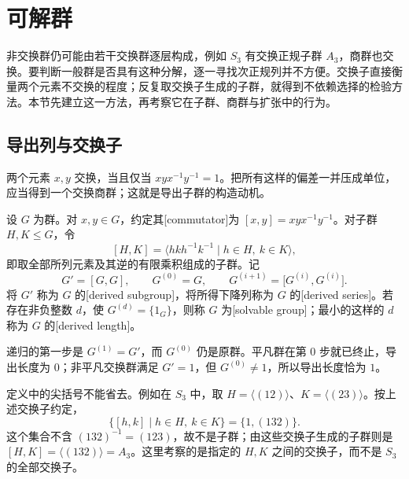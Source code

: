 
\section{可解群}
\label{b1:sec:0702}

非交换群仍可能由若干交换群逐层构成，例如 \(S_3\) 有交换正规子群 \(A_3\)，商群也交换。要判断一般群是否具有这种分解，逐一寻找次正规列并不方便。交换子直接衡量两个元素不交换的程度；反复取交换子生成的子群，就得到不依赖选择的检验方法。本节先建立这一方法，再考察它在子群、商群与扩张中的行为。

%
%

\subsection{导出列与交换子}
\label{b1:subsec:0702:01}

两个元素 \(x,y\) 交换，当且仅当 \(xyx^{-1}y^{-1}=1\)。把所有这样的偏差一并压成单位，应当得到一个交换商群；这就是导出子群的构造动机。

\begin{definition}\label{b1:def:derived-series}
	设 \(G\) 为群。对 \(x,y\in G\)，约定其[commutator]为 \([x,y]=xyx^{-1}y^{-1}\)。对子群 \(H,K\le G\)，令
	\[
		[H,K]=\bigl\langle hkh^{-1}k^{-1}\mid h\in H,\ k\in K\bigr\rangle,
	\]
	即取全部所列元素及其逆的有限乘积组成的子群。记
	\[
		G'= [G,G],\qquad G^{(0)}=G,\qquad G^{(i+1)}=\bigl[G^{(i)},G^{(i)}\bigr].
	\]
	将 \(G'\) 称为 \(G\) 的[derived subgroup]，将所得下降列称为 \(G\) 的[derived series]。若存在非负整数 \(d\)，使 \(G^{(d)}=\{1_G\}\)，则称 \(G\) 为[solvable group]；最小的这样的 \(d\) 称为 \(G\) 的[derived length]。
\end{definition}

递归的第一步是 \(G^{(1)}=G'\)，而 \(G^{(0)}\) 仍是原群。平凡群在第 \(0\) 步就已终止，导出长度为 \(0\)；非平凡交换群满足 \(G'=1\)，但 \(G^{(0)}\ne1\)，所以导出长度恰为 \(1\)。

\ProseParagraphBreak
定义中的尖括号不能省去。例如在 \(S_3\) 中，取 \(H=\langle(12)\rangle\)、\(K=\langle(23)\rangle\)。按上述交换子约定，
\[
	\bigl\{[h,k]\mid h\in H,\ k\in K\bigr\}=\{1,(132)\}.
\]
这个集合不含 \((132)^{-1}=(123)\)，故不是子群；由这些交换子生成的子群则是 \([H,K]=\langle(132)\rangle=A_3\)。这里考察的是指定的 \(H,K\) 之间的交换子，而不是 \(S_3\) 的全部交换子。

